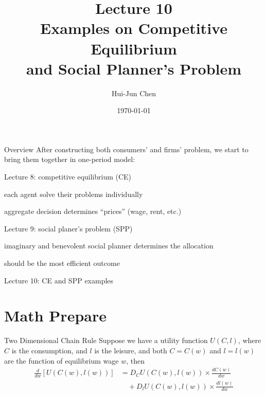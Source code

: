 \documentclass[11pt,aspectratio=169,usenames,dvipsnames]{beamer}
\title[Lecture 9]{Lecture 10 \\ Examples on Competitive Equilibrium \\ and Social Planner's Problem}
\author[Hui-Jun Chen]{Hui-Jun Chen}
\institute[NTHU]{National Tsing Hua University}
\date{\today}
\let\tempone\itemize
\let\temptwo\enditemize
\renewenvironment{itemize}{\tempone\addtolength{\itemsep}{\fill}}{\temptwo}
\begin{document}
\begin{frame}[plain]
    \titlepage
\end{frame}

\begin{frame}{Overview}
\label{slide:Overview}
    After constructing both \alert{consumers'} and \alert{firms'} problem, we start to bring them together in \alert{one-period model}:
    \begin{itemize}
        \item Lecture 8: \alert{competitive equilibrium} (CE)
        \begin{itemize}
            \item each agent solve their problems individually
            \item aggregate decision determines ``prices'' (wage, rent, etc.)
        \end{itemize}
        \item Lecture 9: \alert{social planer's problem} (SPP)
        \begin{itemize}
            \item imaginary and benevolent social planner determines the allocation
            \item should be the most efficient outcome
        \end{itemize}
        \item Lecture 10: CE and SPP examples
    \end{itemize}
\end{frame}

\section{Math Prepare}
\label{sec:Math_Prepare}

\begin{frame}{Two Dimensional Chain Rule}
\label{slide:Two_Dimensional_Chain_Rule}
    Suppose we have a utility function $ U( C, l ) $, where $ C $ is the consumption, and $ l $ is the leisure, and both $ C = C( w ) $ and $ l = l( w ) $ are the function of equilibrium wage $ w $, then
    \begin{equation}
    \label{eq:chain_rule}
        \begin{split}
            \frac{d}{dw} [ U( C( w ), l( w ) ) ]
                & = D_{C}U( C( w ), l( w ) ) \times \frac{d C( w )}{d w}
            \\
                & \quad + D_{l} U( C( w ), l( w ) ) \times \frac{d l( w )}{dw}
            \\
        \end{split}
    \end{equation}
\end{frame}
\end{document}
